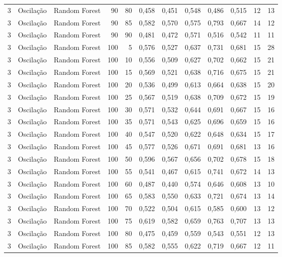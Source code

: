 \begin{longtable}{@{}rllrrrrrrrrr@{}}
3 & Oscilação & Random Forest & 90 & 80 & 0,458 & 0,451 & 0,548 & 0,486 & 0,515 & 12 & 13 \\
3 & Oscilação & Random Forest & 90 & 85 & 0,582 & 0,570 & 0,575 & 0,793 & 0,667 & 14 & 12 \\
3 & Oscilação & Random Forest & 90 & 90 & 0,481 & 0,472 & 0,571 & 0,516 & 0,542 & 11 & 11 \\
3 & Oscilação & Random Forest & 100 & 5 & 0,576 & 0,527 & 0,637 & 0,731 & 0,681 & 15 & 28 \\
3 & Oscilação & Random Forest & 100 & 10 & 0,556 & 0,509 & 0,627 & 0,702 & 0,662 & 15 & 21 \\
3 & Oscilação & Random Forest & 100 & 15 & 0,569 & 0,521 & 0,638 & 0,716 & 0,675 & 15 & 21 \\
3 & Oscilação & Random Forest & 100 & 20 & 0,536 & 0,499 & 0,613 & 0,664 & 0,638 & 15 & 20 \\
3 & Oscilação & Random Forest & 100 & 25 & 0,567 & 0,519 & 0,638 & 0,709 & 0,672 & 15 & 19 \\
3 & Oscilação & Random Forest & 100 & 30 & 0,571 & 0,532 & 0,644 & 0,691 & 0,667 & 15 & 16 \\
3 & Oscilação & Random Forest & 100 & 35 & 0,571 & 0,543 & 0,625 & 0,696 & 0,659 & 15 & 16 \\
3 & Oscilação & Random Forest & 100 & 40 & 0,547 & 0,520 & 0,622 & 0,648 & 0,634 & 15 & 17 \\
3 & Oscilação & Random Forest & 100 & 45 & 0,577 & 0,526 & 0,671 & 0,691 & 0,681 & 13 & 16 \\
3 & Oscilação & Random Forest & 100 & 50 & 0,596 & 0,567 & 0,656 & 0,702 & 0,678 & 15 & 18 \\
3 & Oscilação & Random Forest & 100 & 55 & 0,541 & 0,467 & 0,615 & 0,741 & 0,672 & 14 & 13 \\
3 & Oscilação & Random Forest & 100 & 60 & 0,487 & 0,440 & 0,574 & 0,646 & 0,608 & 13 & 10 \\
3 & Oscilação & Random Forest & 100 & 65 & 0,583 & 0,550 & 0,633 & 0,721 & 0,674 & 13 & 14 \\
3 & Oscilação & Random Forest & 100 & 70 & 0,522 & 0,504 & 0,615 & 0,585 & 0,600 & 13 & 12 \\
3 & Oscilação & Random Forest & 100 & 75 & 0,619 & 0,582 & 0,659 & 0,763 & 0,707 & 13 & 13 \\
3 & Oscilação & Random Forest & 100 & 80 & 0,475 & 0,459 & 0,559 & 0,543 & 0,551 & 12 & 13 \\
3 & Oscilação & Random Forest & 100 & 85 & 0,582 & 0,555 & 0,622 & 0,719 & 0,667 & 12 & 11 \\

\end{longtable}
